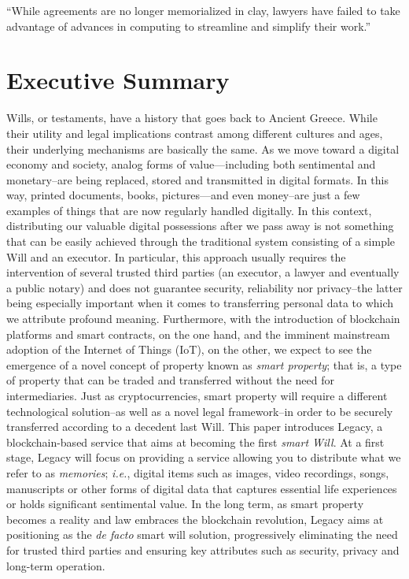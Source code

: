 \begin{savequote}[0.55\linewidth]
	``While agreements are no longer memorialized in clay, lawyers have failed to take advantage of advances in computing to streamline and simplify their work.''
\end{savequote}

\chapter{Executive Summary} %
\label{cha:executive_summary}

Wills, or testaments, have a history that goes back to Ancient Greece. While their utility and legal implications contrast among different cultures and ages, their underlying mechanisms are basically the same. As we move toward a digital economy and society, analog forms of value---including both sentimental and monetary--are being replaced, stored and transmitted in digital formats. In this way, printed documents, books, pictures---and even money--are just a few examples of things that are now regularly handled digitally. In this context, distributing our valuable digital possessions after we pass away is not something that can be easily achieved through the traditional system consisting of a simple Will and an executor. In particular, this approach usually requires the intervention of several trusted third parties (an executor, a lawyer and eventually a public notary) and does not guarantee security, reliability nor privacy--the latter being especially important when it comes to transferring personal data to which we attribute profound meaning. Furthermore, with the introduction of blockchain platforms and smart contracts, on the one hand, and the imminent mainstream adoption of the Internet of Things (IoT), on the other, we expect to see the emergence of a novel concept of property known as \textit{smart property}; that is, a type of property that can be traded and transferred without the need for intermediaries. Just as cryptocurrencies, smart property will require a different technological solution--as well as a novel legal framework--in order to be securely transferred according to a decedent last Will.
This paper introduces Legacy, a blockchain-based service that aims at becoming the first \textit{smart Will}. At a first stage, Legacy will focus on providing a service allowing you to distribute what we refer to as \textit{memories}; \textit{i.e.}, digital items such as images, video recordings, songs, manuscripts or other forms of digital data that captures essential life experiences or holds significant sentimental value. In the long term, as smart property becomes a reality and law embraces the blockchain revolution, Legacy aims at positioning as the \textit{de facto} smart will solution, progressively eliminating the need for trusted third parties and ensuring key attributes such as security, privacy and long-term operation.

